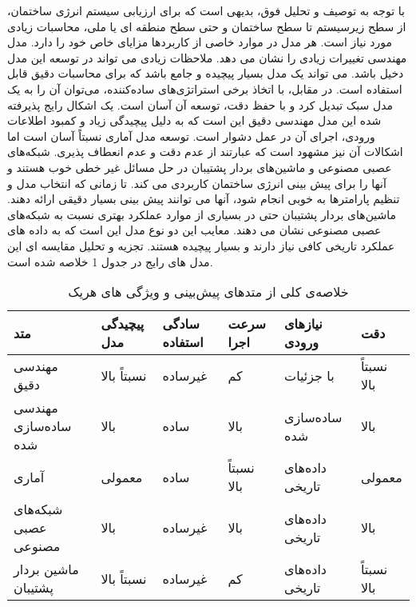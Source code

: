 با توجه به توصیف و تحلیل فوق، بدیهی است که برای ارزیابی سیستم انرژی ساختمان، از سطح زیرسیستم تا سطح ساختمان و حتی سطح منطقه ای یا ملی، محاسبات زیادی مورد نیاز است. هر مدل در موارد خاصی از کاربردها مزایای خاص خود را دارد. مدل مهندسی تغییرات زیادی را نشان می دهد. ملاحظات زیادی می تواند در توسعه این مدل دخیل باشد. می تواند یک مدل بسیار پیچیده و جامع باشد که برای محاسبات دقیق قابل استفاده است. در مقابل، با اتخاذ برخی استراتژی‌های ساده‌کننده، می‌توان آن را به یک مدل سبک تبدیل کرد و با حفظ دقت، توسعه آن آسان است. یک اشکال رایج پذیرفته شده این مدل مهندسی دقیق این است که به دلیل پیچیدگی زیاد و کمبود اطلاعات ورودی، اجرای آن در عمل دشوار است. توسعه مدل آماری نسبتاً آسان است اما اشکالات آن نیز مشهود است که عبارتند از عدم دقت و عدم انعطاف پذیری. شبکه‌های عصبی مصنوعی و ماشین‌های بردار پشتیبان در حل مسائل غیر خطی خوب هستند و آنها را برای پیش بینی انرژی ساختمان کاربردی می کند. تا زمانی که انتخاب مدل و تنظیم پارامترها به خوبی انجام شود، آنها می توانند پیش بینی بسیار دقیقی ارائه دهند. ماشین‌های بردار پشتیبان حتی در بسیاری از موارد عملکرد بهتری نسبت به شبکه‌های عصبی مصنوعی نشان می دهند\cite{li2010prediction}. معایب این دو نوع مدل این است که به داده های عملکرد تاریخی کافی نیاز دارند و بسیار پیچیده هستند. تجزیه و تحلیل مقایسه ای این مدل های رایج در جدول 1 خلاصه شده است.
\begin{table}
    \begin{tabular}{ |p{2cm}|p{2cm}|p{2cm}|p{2cm}|p{2cm}|p{2cm}|  }
        \hline
        متد & پیچیدگی مدل  &سادگی استفاده&سرعت اجرا& نیازهای ورودی& دقت\\
        \hline
        مهندسی دقیق& نسبتاً بالا& غیرساده& کم& با جزئیات& نسبتاً بالا\\
        \hline
        مهندسی ساده‌سازی شده& بالا& ساده& بالا& ساده‌سازی شده& بالا\\
        \hline
        آماری& معمولی& ساده& نسبتاً بالا& داده‌های تاریخی& معمولی\\
        \hline
        شبکه‌های عصبی مصنوعی& بالا& غیرساده& بالا& داده‌های تاریخی& بالا\\
        \hline
        ماشین بردار پشتیبان& نسبتاً بالا& غیرساده& کم& داده‌های تاریخی& نسبتاً بالا\\
        \hline
        \end{tabular}
        \caption[خلاصه‌ی کلی از متد‌های پیش‌بینی و ویژگی های هریک]{خلاصه‌ی کلی از متد‌های پیش‌بینی و ویژگی های هریک}
\end{table}